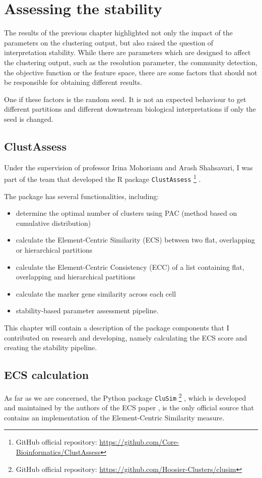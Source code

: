 \chapter{Assessing the stability}

The results of the previous chapter highlighted not only the impact of the parameters on the clustering output, but also raised the question of interpretation stability. While there are parameters which are designed to affect the clustering output, such as the resolution parameter, the community detection, the objective function or the feature space, there are some factors that should not be responsible for obtaining different results.

One if these factors is the random seed. It is not an expected behaviour to get different partitions and different downstream biological interpretations if only the seed is changed.

\section{ClustAssess}
Under the supervision of professor Irina Mohorianu and Arash Shahsavari, I was part of the team that developed the R package \verb|ClustAssess| \footnote{GitHub official repository: \url{https://github.com/Core-Bioinformatics/ClustAssess}} \cite{clustassess}.

The package has several functionalities, including:
\begin{itemize}
    \item determine the optimal number of clusters using PAC (method based on cumulative distribution)
    \item calculate the Element-Centric Similarity (ECS) between two flat, overlapping or hierarchical partitions
    \item calculate the Element-Centric Consistency (ECC) of a list containing flat, overlapping and hierarchical partitions
    \item calculate the marker gene similarity across each cell
    \item stability-based parameter assessment pipeline.
\end{itemize}
This chapter will contain a description of the package components that I contributed on research and developing, namely calculating the ECS score and creating the stability pipeline.

\section{ECS calculation}
As far as we are concerned, the Python package \verb|CluSim| \footnote{GitHub official repository: \url{https://github.com/Hoosier-Clusters/clusim}} \cite{Gates2019b}, which is developed and maintained by the authors of the ECS paper \cite{Gates2019}, is the only official source that contains an implementation of the Element-Centric Similarity measure.


